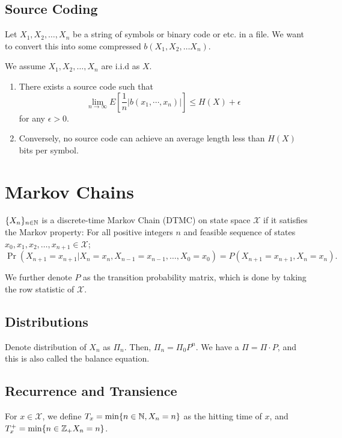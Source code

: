 \documentclass{article}
\begin{document}
\subsection{Source Coding}
	Let $X_1, X_2, \ldots, X_n$ be a string of symbols or binary code or etc. in a file. We want to convert this into some compressed $b(X_1, X_2, \ldots X_n)$.
\begin{theorem}
	We assume $X_1, X_2, \ldots, X_n$ are i.i.d as $X$.
	\begin{enumerate}
		\item There exists a source code such that 
			\[\lim_{n \to \infty} E\left[\frac{1}{n} |b(x_1, \cdots, x_n)|\right] \leq H(X) + \epsilon\] for any $\epsilon > 0.$ 

		\item Conversely, no source code can achieve an average length less than $H(X)$ bits per symbol. 
	\end{enumerate}
\end{theorem}

\section{Markov Chains}
\begin{definition}
	$\{X_n\}_{n \in \mathbb N}$ is a discrete-time Markov Chain (DTMC) on state space $\mathcal{X}$ if it satisfies the Markov property: For all positive integers $n$ and feasible sequence of states $x_0, x_1, x_2, \ldots, x_{n+1} \in \mathcal{X}$; 
	\[\Pr(X_{n+1} = x_{n+1} | X_n = x_n, X_{n-1} = x_{n-1}, \ldots, X_0 = x_0) = P(X_{n+1} = x_{n+1}, X_n = x_n).\]
\end{definition}

We further denote $P$ as the transition probability matrix, which is done by taking the row statistic of $\mathcal{X}$.

\subsection{Distributions}
Denote distribution of $X_n$ as $\Pi_n$. Then, $\Pi_n = \Pi_0 P^n$. We have a  $\Pi = \Pi \cdot P$, and this is also called the balance equation. 

\subsection{Recurrence and Transience}
For $x \in \mathcal{X}$, we define $T_x = \min \{n \in \mathbb N, X_n = n\}$ as the hitting time of $x$, and $T_x^+ = \min \{n \in \mathbb Z_+ X_n = n\}$.
\end{document}
